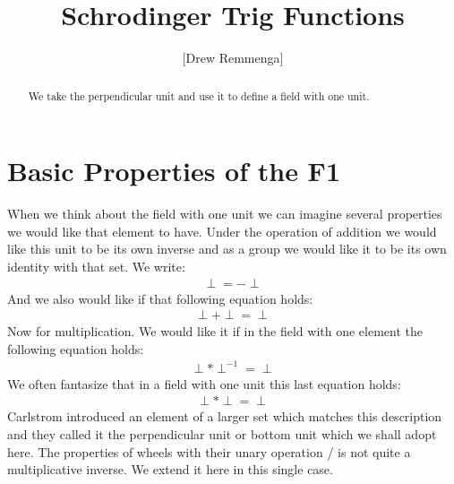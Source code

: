 \documentclass[10pt, oneside]{article}
\title{Schrodinger Trig Functions}
\author{[Drew Remmenga]}
\begin{document}
\maketitle
\begin{abstract}
    We take the perpendicular unit and use it to define a field with one unit. 
\end{abstract}
\section{Basic Properties of the F1}
    When we think about the field with one unit we can imagine several properties we would like that element to have. 
    Under the operation of addition we would like this unit to be its own inverse and as a group we would like it to be its own identity with that set.
    We write:
    \begin{align}
        \perp = -\perp \label{add:inv}
    \end{align}
    And we also would like if that following equation holds:
    \begin{align}
        \perp + \perp = \perp \label{add:id}
    \end{align}
    Now for multiplication. We would like it if in the field with one element the following equation holds:
    \begin{align}
        \perp * \perp^{-1} = \perp \label{mult:id}
    \end{align}
    We often fantasize that in a field with one unit this last equation holds:
    \begin{align}
        \perp * \perp = \perp \label{mult:inv}
    \end{align}
    Carlstrom introduced an element of a larger set which matches this description \cite{Carlstrom2001Wheels} and they called it the perpendicular unit or bottom unit which we shall adopt here.
    The properties of wheels with their unary operation / is not quite a multiplicative inverse. We extend it here in this single case. 
\end{document}

